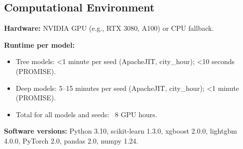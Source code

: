 \subsection{Computational Environment}

\textbf{Hardware:} NVIDIA GPU (e.g., RTX 3080, A100) or CPU fallback.

\textbf{Runtime per model:}
\begin{itemize}
\item Tree models: <1 minute per seed (ApacheJIT, city\_hour); <10 seconds (PROMISE).
\item Deep models: 5--15 minutes per seed (ApacheJIT, city\_hour); <1 minute (PROMISE).
\item Total for all models and seeds: ~8 GPU hours.
\end{itemize}

\textbf{Software versions:} Python 3.10, scikit-learn 1.3.0, xgboost 2.0.0, lightgbm 4.0.0, PyTorch 2.0, pandas 2.0, numpy 1.24.



